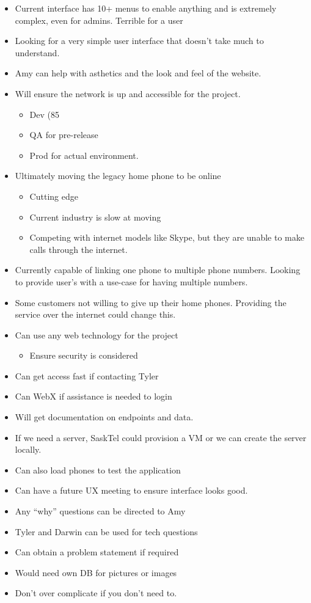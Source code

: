 \documentclass[12pt]{article}
\begin{document}
\begin{itemize}
	\item Current interface has 10+ menus to enable anything and is extremely complex, even for admins. Terrible for a user
	\item Looking for a very simple user interface that doesn’t take much to understand.
	\item Amy can help with asthetics and the look and feel of the website.
	\item Will ensure the network is up and accessible for the project.
	\begin{itemize}
		\item Dev (85%
		\item QA for pre-release
		\item Prod for actual environment.
	\end{itemize}
	\item Ultimately moving the legacy home phone to be online
	\begin{itemize}
		\item Cutting edge
		\item Current industry is slow at moving
		\item Competing with internet models like Skype, but they are unable to make calls through the internet.
	\end{itemize}
	\item Currently capable of linking one phone to multiple phone numbers. Looking to provide user’s with a use-case for having multiple numbers.
	\item Some customers not willing to give up their home phones. Providing the service over the internet could change this.
	\item Can use any web technology for the project
	\begin{itemize}
		\item Ensure security is considered
	\end{itemize}
	\item Can get access fast if contacting Tyler
	\item Can WebX if assistance is needed to login
	\item Will get documentation on endpoints and data.
	\item If we need a server, SaskTel could provision a VM or we can create the server locally.
	\item Can also load phones to test the application
	\item Can have a future UX meeting to ensure interface looks good.
	\item Any “why” questions can be directed to Amy
	\item Tyler and Darwin can be used for tech questions
	\item Can obtain a problem statement if required
	\item Would need own DB for pictures or images
	\item Don’t over complicate if you don’t need to.
\end{itemize}
\end{document}
